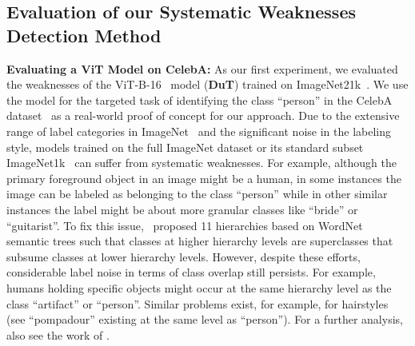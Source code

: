 \subsection{Evaluation of our Systematic Weaknesses Detection Method}
\label{sec:results:celebA}
\textbf{Evaluating a ViT Model on CelebA:}
As our first experiment, we evaluated the weaknesses of the ViT-B-16~\citep{dosovitskiy2020image} model (\textbf{DuT}) trained on ImageNet21k~\citep{ridnik2021imagenet}. We use the model for the targeted task of identifying the class ``person'' in the CelebA dataset~\citep{liu2015faceattributes} as a real-world proof of concept for our approach. 
Due to the extensive range of label categories in ImageNet~\citep{deng2009imagenet} and the significant noise in the labeling style, models trained on the full ImageNet dataset or its standard subset ImageNet1k~\citep{russakovsky2015imagenet} can suffer from systematic weaknesses.
For example, although the primary foreground object in an image might be a human, in some instances the image can be labeled as belonging to the class ``person'' while in other similar instances the label might be about more granular classes like ``bride'' or ``guitarist''.
To fix this issue,~\citep{ridnik2021imagenet} proposed 11 hierarchies based on WordNet~\citep{miller1995wordnet} semantic trees such that classes at higher hierarchy levels are superclasses that subsume classes at lower hierarchy levels.
However, despite these efforts, considerable label noise in terms of class overlap still persists. For example, humans holding specific objects might occur at the same hierarchy level as the class ``artifact'' or ``person''. Similar problems exist, for example, for hairstyles (see ``pompadour'' existing at the same level as ``person''). 
For a further analysis, also see the work of \citep{northcutt2021confident}.


